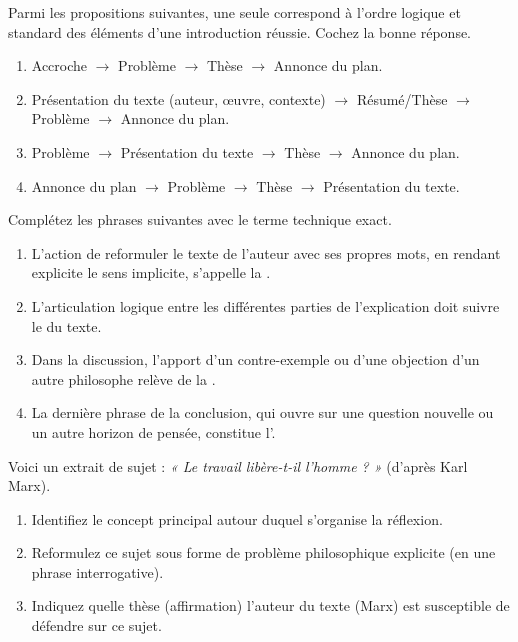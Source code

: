 \documentclass[11pt]{article}
\begin{document}
\begin{exercice}
\noindent Parmi les propositions suivantes, une seule correspond à l'ordre logique et standard des éléments d'une introduction réussie. Cochez la bonne réponse.
\begin{enumerate}
    \item Accroche $\rightarrow$ Problème $\rightarrow$ Thèse $\rightarrow$ Annonce du plan.
    \item Présentation du texte (auteur, œuvre, contexte) $\rightarrow$ Résumé/Thèse $\rightarrow$ Problème $\rightarrow$ Annonce du plan.
    \item Problème $\rightarrow$ Présentation du texte $\rightarrow$ Thèse $\rightarrow$ Annonce du plan.
    \item Annonce du plan $\rightarrow$ Problème $\rightarrow$ Thèse $\rightarrow$ Présentation du texte.
\end{enumerate}
\end{exercice}

\begin{exercice}
\noindent Complétez les phrases suivantes avec le terme technique exact.
\begin{enumerate}
    \item L'action de reformuler le texte de l'auteur avec ses propres mots, en rendant explicite le sens implicite, s'appelle la \underline{\hspace{5cm}}.
    \item L'articulation logique entre les différentes parties de l'explication doit suivre le \underline{\hspace{5cm}} du texte.
    \item Dans la discussion, l'apport d'un contre-exemple ou d'une objection d'un autre philosophe relève de la \underline{\hspace{5cm}}.
    \item La dernière phrase de la conclusion, qui ouvre sur une question nouvelle ou un autre horizon de pensée, constitue l'\underline{\hspace{5cm}}.
\end{enumerate}
\end{exercice}

\begin{exercice}
\noindent Voici un extrait de sujet : \og \textit{« Le travail libère-t-il l'homme ? »} \fg (d'après Karl Marx).
\begin{enumerate}
    \item Identifiez le concept principal autour duquel s'organise la réflexion.
    \item Reformulez ce sujet sous forme de problème philosophique explicite (en une phrase interrogative).
    \item Indiquez quelle thèse (affirmation) l'auteur du texte (Marx) est susceptible de défendre sur ce sujet.
\end{enumerate}
\end{exercice}
\end{document}
